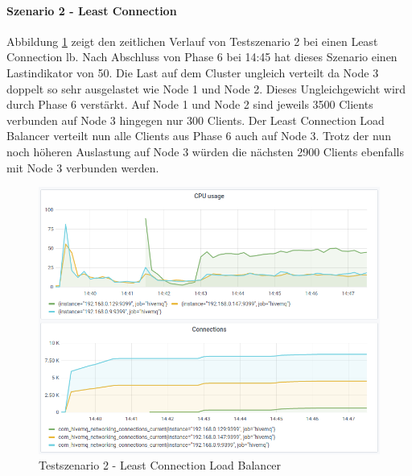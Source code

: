 \paragraph{Szenario 2 - Least Connection}
Abbildung \ref{fig:s2-lc} zeigt den zeitlichen Verlauf von Testszenario 2 bei einen Least Connection \ac{lb}.
Nach Abschluss von Phase 6 bei 14:45 hat dieses Szenario einen Lastindikator von 50.
Die Last auf dem Cluster ungleich verteilt da Node 3 doppelt so sehr ausgelastet wie Node 1 und Node 2. Dieses Ungleichgewicht wird durch Phase 6 verstärkt. Auf Node 1 und Node 2 sind jeweils 3500 Clients verbunden auf Node 3 hingegen nur 300 Clients. Der Least Connection Load Balancer verteilt nun alle Clients aus Phase 6 auch auf Node 3. Trotz der nun noch höheren Auslastung auf Node 3 würden die nächsten 2900 Clients ebenfalls mit Node 3 verbunden werden.
\begin{figure}
    \centering
    \includegraphics[scale=0.8]{images/s2_lc.png}
    \caption{Testszenario 2 - Least Connection Load Balancer}
    \label{fig:s2-lc}
\end{figure}

